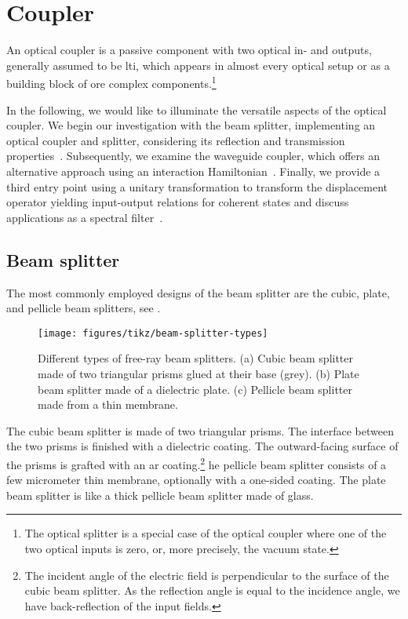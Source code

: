 \section{Coupler}

An optical coupler is a passive component with two optical in- and outputs, generally assumed to be \gls{lti}, which appears in almost every optical setup or as a building block of ore complex components.\footnote{The optical splitter is a special case of the optical coupler where one of the two optical inputs is zero, or, more precisely, the vacuum state.}

In the following, we would like to illuminate the versatile aspects of the optical coupler.
We begin our investigation with the beam splitter, implementing an optical coupler and splitter, considering its reflection and transmission properties~\cite{Gerry2005,Vogel2006}.
Subsequently, we examine the waveguide coupler, which offers an alternative approach using an interaction Hamiltonian~\cite{Haroche2006}.
Finally, we provide a third entry point using a unitary transformation to transform the displacement operator yielding input-output relations for coherent states and discuss applications as a spectral filter~\cite{Leonhard2010,Vogel2006}.

\subsection{Beam splitter}

The most commonly employed designs of the beam splitter are the cubic, plate, and pellicle beam splitters, see .
\begin{figure}[htb]
    \centering
    \texttt{[image: figures/tikz/beam-splitter-types]}
    \caption{Different types of free-ray beam splitters. (a) Cubic beam splitter made of two triangular prisms glued at their base (grey). (b) Plate beam splitter made of a dielectric plate. (c) Pellicle beam splitter made from a thin membrane.}\label{fig:beam_splitter_types}
\end{figure}
The cubic beam splitter is made of two triangular prisms.
The interface between the two prisms is finished with a dielectric coating.
The outward-facing surface of the prisms is grafted with an \gls{ar} coating.\footnote{The incident angle of the electric field is perpendicular to the surface of the cubic beam splitter. As the reflection angle is equal to the incidence angle, we have back-reflection of the input fields.}
he pellicle beam splitter consists of a few micrometer thin membrane, optionally with a one-sided coating.
The plate beam splitter is like a thick pellicle beam splitter made of glass.

